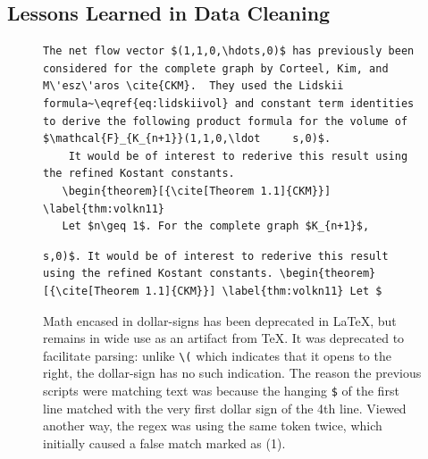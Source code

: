\documentclass{article}
\begin{document}
\begin{appendix}
  \section{Lessons Learned in Data Cleaning}
\begin{figure}[]
  \begin{lstlisting}[escapechar=!, basicstyle=\small\ttfamily, firstnumber=1132]
    The net flow vector $(1,1,0,\hdots,0)$ has previously been considered for the complete graph by Corteel, Kim, and M\'esz\'aros \cite{CKM}.  They used the Lidskii formula~\eqref{eq:lidskiivol} and constant term identities to derive the following product formula for the volume of $\mathcal{F}_{K_{n+1}}(1,1,0,\ldot     s,0)$.
    It would be of interest to rederive this result using the refined Kostant constants.
   \begin{theorem}[{\cite[Theorem 1.1]{CKM}}] \label{thm:volkn11}
   Let $n\geq 1$. For the complete graph $K_{n+1}$,

  \end{lstlisting}
  \begin{lstlisting}[basicstyle=\small\ttfamily]
  s,0)$. It would be of interest to rederive this result using the refined Kostant constants. \begin{theorem}[{\cite[Theorem 1.1]{CKM}}] \label{thm:volkn11} Let $    
  \end{lstlisting}
   \cprotect\caption{Math encased in dollar-signs has been deprecated in
  \LaTeX{}, but remains in wide use as an artifact from \TeX{}. It was
  deprecated to facilitate parsing: unlike \verb|\(| which indicates that it
  opens to the right, the dollar-sign has no such indication. The reason the
  previous scripts were matching text was because the hanging \verb|$| of the
  first line matched with the very first dollar sign of the 4th line. Viewed another way,
  the regex was using the same token twice, which initially caused a false match marked as (1).
}


\end{figure}

\end{appendix}
\end{document}
